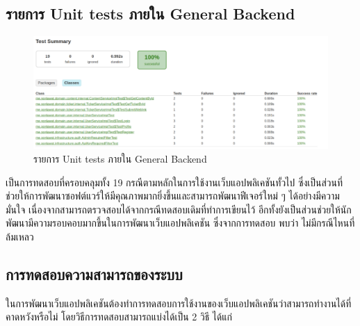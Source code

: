 \documentclass[12pt,oneside,openright,a4paper]{cpe-thai-project}
\begin{document}
      \subsection{รายการ Unit tests ภายใน General Backend} 
        \begin{figure}[!ht]\centering
          \includegraphics[width=\textwidth]{./img/unit_test.png}
          \caption{รายการ Unit tests ภายใน General Backend}\label{fig:unit_test}
        \end{figure}
        \hspace{1cm}เป็นการทดสอบที่ครอบคลุมทั้ง 19 กรณีตามหลักในการใช้งานเว็บแอปพลิเคชันทั้วไป 
        ซึ่งเป็นส่วนที่ช่วยให้การพัฒนาซอฟต์แวร์ให้มีคุณภาพมากยิ่งขึ้นและสามารถพัฒนาฟีเจอร์ใหม่ ๆ ได้อย่างมีความมั่นใจ
        เนื่องจากสามารถตรวจสอบได้จากกรณีทดสอบเดิมที่ทำการเขียนไว้ 
        อีกทั้งยังเป็นส่วนช่วยให้นักพัฒนามีความรอบคอบมากขึ้นในการพัฒนาเว็บแอปพลิเคชัน
        ซึ่งจากการทดสอบ พบว่า ไม่มีกรณีไหนที่ล้มเหลว
      
      \subsection{การทดสอบความสามารถของระบบ}
        \hspace{1cm}ในการพัฒนาเว็บแอปพลิเคชันต้องทำการทดสอบการใช้งานของเว็บแอปพลิเคชันว่าสามารถทำงานได้ที่คาดหวังหรือไม่ 
        โดยวิธีการทดสอบสามารถแบ่งได้เป็น 2 วิธี ได้แก่
\end{document}
